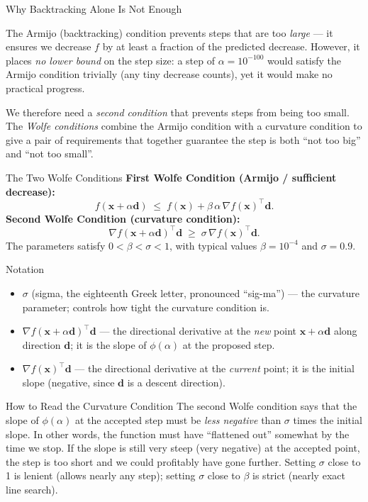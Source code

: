 \documentclass[aspectratio=169,10pt]{beamer}
\newcommand{\bx}{\mathbf{x}}
\newcommand{\bd}{\mathbf{d}}
\newcommand{\grad}{\nabla}
\begin{document}
\begin{frame}[allowframebreaks]{Why Backtracking Alone Is Not Enough}

  The Armijo (backtracking) condition prevents steps that are too
  \emph{large} --- it ensures we decrease $f$ by at least a fraction of
  the predicted decrease.  However, it places \emph{no lower bound} on
  the step size: a step of $\alpha = 10^{-100}$ would satisfy the Armijo
  condition trivially (any tiny decrease counts), yet it would make no
  practical progress.

  We therefore need a \emph{second condition} that prevents steps from
  being too small.  The \emph{Wolfe conditions} combine the Armijo
  condition with a curvature condition to give a pair of requirements
  that together guarantee the step is both ``not too big'' and ``not too
  small''.

  \begin{block}{The Two Wolfe Conditions}
    \textbf{First Wolfe Condition (Armijo / sufficient decrease):}
    \[
      f(\bx + \alpha\bd)
      \;\le\;
      f(\bx) + \beta\,\alpha\,\grad f(\bx)^{\top}\bd.
    \]
    \textbf{Second Wolfe Condition (curvature condition):}
    \[
      \grad f(\bx + \alpha\bd)^{\top}\bd
      \;\ge\;
      \sigma\,\grad f(\bx)^{\top}\bd.
    \]
    The parameters satisfy $0 < \beta < \sigma < 1$, with typical
    values $\beta = 10^{-4}$ and $\sigma = 0.9$.
  \end{block}

  \begin{block}{Notation}
    \begin{itemize}
      \item $\sigma$ (sigma, the eighteenth Greek letter, pronounced
            ``sig-ma'') --- the curvature parameter; controls how tight
            the curvature condition is.
      \item $\grad f(\bx + \alpha\bd)^{\top}\bd$ --- the directional
            derivative at the \emph{new} point $\bx + \alpha\bd$ along
            direction $\bd$; it is the slope of $\phi(\alpha)$ at the
            proposed step.
      \item $\grad f(\bx)^{\top}\bd$ --- the directional derivative at
            the \emph{current} point; it is the initial slope (negative,
            since $\bd$ is a descent direction).
    \end{itemize}
  \end{block}

  \framebreak

  \begin{alertblock}{How to Read the Curvature Condition}
    The second Wolfe condition says that the slope of $\phi(\alpha)$
    at the accepted step must be \emph{less negative} than $\sigma$
    times the initial slope.  In other words, the function must have
    ``flattened out'' somewhat by the time we stop.  If the slope is
    still very steep (very negative) at the accepted point, the step is
    too short and we could profitably have gone further.  Setting $\sigma$
    close to 1 is lenient (allows nearly any step); setting $\sigma$
    close to $\beta$ is strict (nearly exact line search).
  \end{alertblock}


\end{frame}
\end{document}
